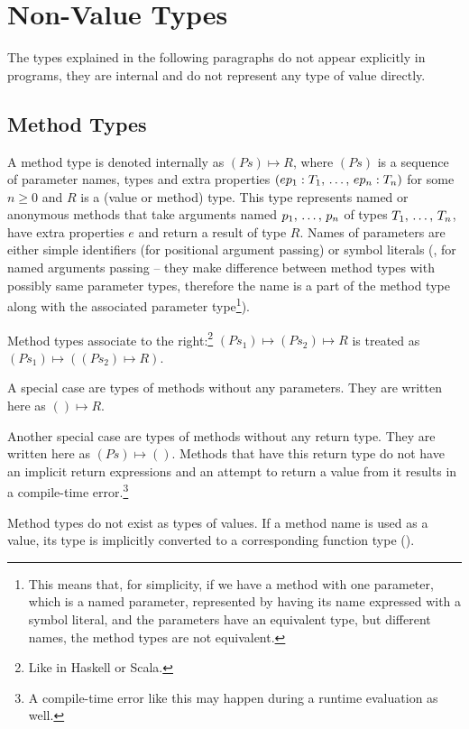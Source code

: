 \section{Non-Value Types}

The types explained in the following paragraphs do not appear explicitly in programs, they are internal and do not represent any type of value directly. 

\subsection{Method Types}
\label{sec:method-types}

A method type is denoted internally as $(Ps) \mapsto R$, where $(Ps)$ is a sequence of parameter names, types and extra properties $(ep_1 : T_1 ,\, \ldots ,\, ep_n : T_n)$ for some $n \geq 0$ and $R$ is a (value or method) type. This type represents named or anonymous methods that take arguments named $p_1 ,\, \ldots ,\, p_n$ of types $T_1 ,\, \ldots ,\, T_n$, have extra properties $e$ and return a result of type $R$. Names of parameters are either simple identifiers (for positional argument passing) or symbol literals (, for named arguments passing -- they make difference between method types with possibly same parameter types, therefore the name is a part of the method type along with the associated parameter type\footnote{This means that, for simplicity, if we have a method with one parameter, which is a named parameter, represented by having its name expressed with a symbol literal, and the parameters have an equivalent type, but different names, the method types are not equivalent.}). 

Method types associate to the right:\footnote{Like in Haskell or Scala.} \newline
$(Ps_1) \mapsto (Ps_2) \mapsto R$ is treated as $(Ps_1) \mapsto ((Ps_2) \mapsto R)$. 

A special case are types of methods without any parameters. They are written here as $() \mapsto R$. 

Another special case are types of methods without any return type. They are written here as $(Ps) \mapsto ()$. Methods that have this return type do not have an implicit return expressions and an attempt to return a value from it results in a compile-time error.\footnote{A compile-time error like this may happen during a runtime evaluation as well.}

Method types do not exist as types of values. If a method name is used as a value, its type is implicitly converted to a corresponding function type (). 

